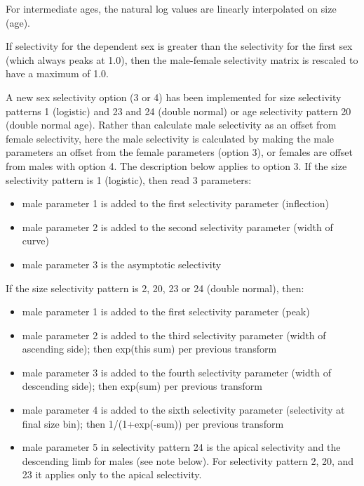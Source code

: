 For intermediate ages, the natural log values are linearly interpolated on size (age).

If selectivity for the dependent sex is greater than the selectivity for the first sex (which always peaks at 1.0), then the male-female selectivity matrix is rescaled to have a maximum of 1.0.

\hypertarget{MaleSelectivityOffset}{}
A new sex selectivity option (3 or 4) has been implemented for size selectivity patterns 1 (logistic) and 23 and 24 (double normal) or age selectivity pattern 20 (double normal age). Rather than calculate male selectivity as an offset from female selectivity, here the male selectivity is calculated by making the male parameters an offset from the female parameters (option 3), or females are offset from males with option 4. The description below applies to option 3. If the size selectivity pattern is 1 (logistic), then read 3 parameters:
\begin{itemize}
	\item male parameter 1 is added to the first selectivity parameter (inflection)
	\item male parameter 2 is added to the second selectivity parameter (width of curve)
	\item male parameter 3 is the asymptotic selectivity
\end{itemize}

If the size selectivity pattern is 2, 20, 23 or 24 (double normal), then:
\begin{itemize}
	\item male parameter 1 is added to the first selectivity parameter (peak)
	\item male parameter 2 is added to the third selectivity parameter (width of ascending side); then exp(this sum) per previous transform
	\item male parameter 3 is added to the fourth selectivity parameter (width of descending side); then exp(sum) per previous transform
	\item male parameter 4 is added to the sixth selectivity parameter (selectivity at final size bin); then 1/(1+exp(-sum)) per previous transform
	\item male parameter 5 in selectivity pattern 24 is the apical selectivity and the descending limb for males (see note below). For selectivity pattern 2, 20, and 23 it applies only to the apical selectivity.
\end{itemize}

